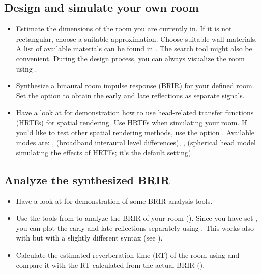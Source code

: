 \documentclass[a4paper, fleqn, 11pt]{article}
\begin{document}
\subsection{Design and simulate your own room}
\label{task:design}
\begin{itemize}
  \item Estimate the dimensions of the room you are currently in. If it is not rectangular, choose a suitable approximation. Choose suitable wall materials. A list of available materials can be found in . The search tool  might also be convenient. During the design process, you can always visualize the room using .
  
  \item Synthesize a binaural room impulse response (BRIR) for your defined room. Set the option  to obtain the early and late reflections as separate signals.
  \item Have a look at  for demonstration how to use head-related transfer functions (HRTFs) for spatial rendering. Use HRTFs when simulating your room.
  If you’d like to test other spatial rendering methods, use the option . Available modes are: ,  (broadband interaural level differences), ,  (spherical head model simulating the effects of HRTFs; it’s the default setting).
\end{itemize}

\newpage
\subsection{Analyze the synthesized BRIR}
\begin{itemize}
  \item Have a look at  for demonstration of some BRIR analysis tools.
  \item Use the tools from  to analyze the BRIR of your room 
  (). Since you have set , you can plot the early and late reflections separately using . This works also with  but with a slightly different syntax (see ).
  \item Calculate the estimated reverberation time (RT) of the room using  and compare it with the RT calculated from the actual BRIR ().
\end{itemize}
\end{document}
